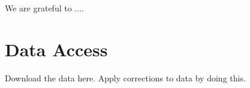 \documentclass[preprint2]{aastex}
\begin{document}
\acknowledgments

We are grateful to ....



\appendix

\section{Data Access}

Download the data here. Apply corrections to data by doing this.



\end{document}
